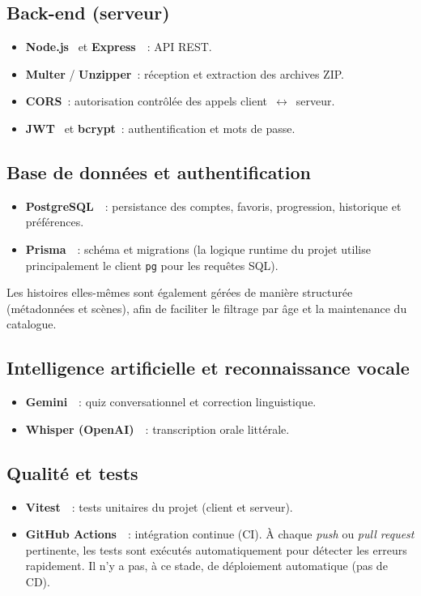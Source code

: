 \documentclass[12pt,twoside,letterpaper]{article}
\begin{document}
\subsection{Back-end (serveur)}
\begin{itemize}
    \item \textbf{Node.js}~\cite{ref_nodejs} et \textbf{Express}~\cite{ref_express}~: API REST.
    \item \textbf{Multer} / \textbf{Unzipper}~: réception et extraction des archives ZIP.
    \item \textbf{CORS}~: autorisation contrôlée des appels client~$\leftrightarrow$~serveur.
    \item \textbf{JWT}~\cite{ref_jwt} et \textbf{bcrypt}~: authentification et mots de passe.
\end{itemize}

\subsection{Base de données et authentification}
\begin{itemize}
    \item \textbf{PostgreSQL}~\cite{ref_postgres}~: persistance des comptes, favoris, progression, historique et préférences.
    \item \textbf{Prisma}~\cite{ref_prisma}~: schéma et migrations (la logique runtime du projet utilise principalement le client \texttt{pg} pour les requêtes SQL).
\end{itemize}

Les histoires elles-mêmes sont également gérées de manière structurée (métadonnées et scènes), afin de faciliter le filtrage par âge et la maintenance du catalogue.

\subsection{Intelligence artificielle et reconnaissance vocale}
\begin{itemize}
    \item \textbf{Gemini}~\cite{ref_gemini}~: quiz conversationnel et correction linguistique.
    \item \textbf{Whisper (OpenAI)}~\cite{ref_whisper_api}~: transcription orale littérale.
\end{itemize}

\subsection{Qualité et tests}
\begin{itemize}
    \item \textbf{Vitest}~\cite{ref_vitest}~: tests unitaires du projet (client et serveur).
    \item \textbf{GitHub Actions}~\cite{ref_gha}~: intégration continue (CI). À chaque \emph{push} ou \emph{pull request} pertinente, les tests sont exécutés automatiquement pour détecter les erreurs rapidement. Il n'y a pas, à ce stade, de déploiement automatique (pas de CD).
\end{itemize}
\end{document}
